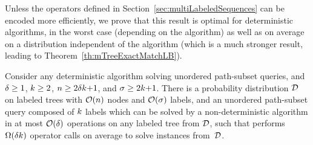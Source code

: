 Unless the operators defined in
Section~\ref{sec:multiLabeledSequences} can be encoded more
efficiently, we prove that this result is optimal for deterministic
algorithms, in the worst case (depending on the algorithm) as well as
on average on a distribution independent of the algorithm (which is a
much stronger result, leading to Theorem~\ref{th:mTreeExactMatchLB}).

\begin{lemma}\label{lem:mTreeExactMatchLB}
  Consider any deterministic algorithm  solving unordered
  path-subset queries, and $\delta\geq1$, $k\geq2$,
  $n\geq2\delta k{+}1$, and
  $\sigma\geq2k{+}1$.
  There is a probability distribution $\cal D$ on labeled trees with
  ${\cal O}(n)$ nodes and ${\cal O}(\sigma)$ labels, and
  an unordered path-subset query composed of $k$ labels
  which can be solved by a non-deterministic algorithm in at most
  ${\cal O}(\delta)$ operations on any labeled tree from $\cal D$,
  such that  performs $\Omega(\delta k)$
  operator calls on average to solve instances from~$\cal D$.
\end{lemma}
